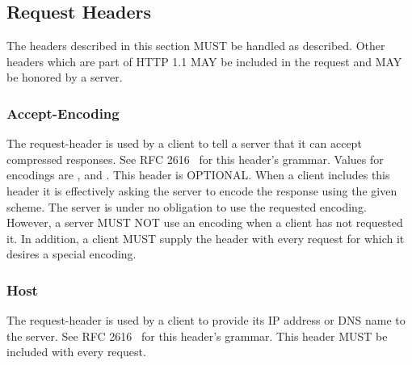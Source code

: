 \documentclass[justify]{dods-paper}
\begin{document}
\label{note-1}



\subsection{Request Headers}


The headers described in this section MUST be handled as described.
Other headers which are part of HTTP 1.1 MAY be included in the
request and MAY be honored by a \DAP server.

\subsubsection{Accept-Encoding}
\label{sec-accept-encoding}

The  request-header is used by a \DAP client to
tell a server that it can accept compressed responses. See RFC
2616~\cite{rfc2616} for this header's grammar.  Values for encodings are
,  and . This header is
OPTIONAL. When a client includes this header it is effectively asking the
\DAP server to encode the response using the given scheme. The server is
under no obligation to use the requested encoding. However, a server MUST NOT
use an encoding when a client has not requested it. In addition, a client
MUST supply the header with every request for which it desires a special
encoding.

\subsubsection{Host}
\label{sec-host}

The  request-header is used by a \DAP client to provide its
IP address or DNS name to the \DAP server. See RFC 2616~\cite{rfc2616}
for this header's grammar. This header MUST be included with every request.
\end{document}
